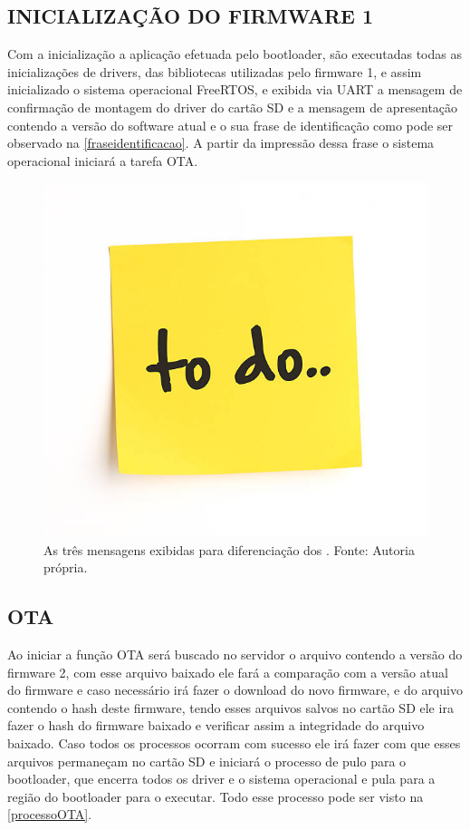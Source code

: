 \subsection{INICIALIZAÇÃO DO FIRMWARE 1}
Com a inicialização a aplicação efetuada pelo bootloader, são executadas todas as inicializações de drivers, das bibliotecas utilizadas pelo firmware 1, e assim inicializado o sistema operacional FreeRTOS, e exibida via UART a mensagem de confirmação de montagem do driver do cartão SD e a mensagem de apresentação contendo a versão do software atual e o sua frase de identificação como pode ser observado na \autoref{fraseidentificacao}. A partir da impressão dessa frase o sistema operacional iniciará a tarefa OTA.

\begin{figure}[H]
    \scriptsize
     \centering
     \includegraphics[scale=1.2]{dados/figuras/ToDo.jpg}
     \caption{As três mensagens exibidas para diferenciação dos \firmware. \newline Fonte: Autoria própria.}
     \label{fraseidentificacao}
\end{figure}


\subsection{OTA}
Ao iniciar a função OTA será buscado no servidor o arquivo contendo a versão do firmware 2, com esse arquivo baixado ele fará a comparação com a versão atual do firmware e caso necessário irá fazer o download do novo firmware, e do arquivo contendo o hash deste firmware, tendo esses arquivos salvos no cartão SD ele ira fazer o hash do firmware baixado e verificar assim a integridade do arquivo baixado. Caso todos os processos ocorram com sucesso ele irá fazer com que esses arquivos permaneçam no cartão SD e iniciará o processo de pulo para o bootloader, que encerra todos os driver e o sistema operacional e pula para a região do bootloader para o executar. Todo esse processo pode ser visto na \autoref{processoOTA}.

